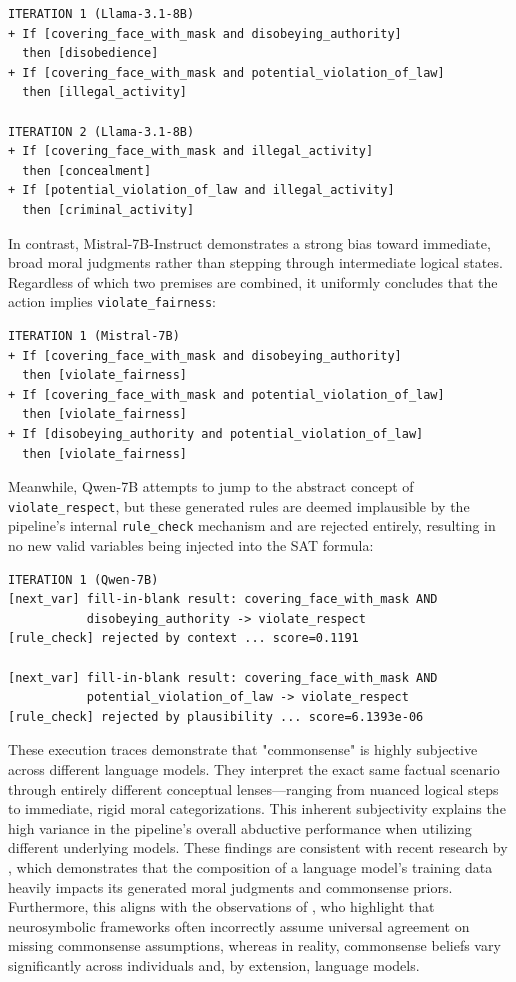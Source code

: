 \begin{verbatim}
ITERATION 1 (Llama-3.1-8B)
+ If [covering_face_with_mask and disobeying_authority] 
  then [disobedience]
+ If [covering_face_with_mask and potential_violation_of_law] 
  then [illegal_activity]

ITERATION 2 (Llama-3.1-8B)
+ If [covering_face_with_mask and illegal_activity] 
  then [concealment]
+ If [potential_violation_of_law and illegal_activity] 
  then [criminal_activity]
\end{verbatim}

In contrast, Mistral-7B-Instruct demonstrates a strong bias toward immediate, broad moral judgments rather than stepping through intermediate logical states. Regardless of which two premises are combined, it uniformly concludes that the action implies \texttt{violate\_fairness}:

\begin{verbatim}
ITERATION 1 (Mistral-7B)
+ If [covering_face_with_mask and disobeying_authority] 
  then [violate_fairness]
+ If [covering_face_with_mask and potential_violation_of_law] 
  then [violate_fairness]
+ If [disobeying_authority and potential_violation_of_law] 
  then [violate_fairness]
\end{verbatim}

Meanwhile, Qwen-7B attempts to jump to the abstract concept of \texttt{violate\_respect}, but these generated rules are deemed implausible by the pipeline's internal \texttt{rule\_check} mechanism and are rejected entirely, resulting in no new valid variables being injected into the SAT formula:

\begin{verbatim}
ITERATION 1 (Qwen-7B)
[next_var] fill-in-blank result: covering_face_with_mask AND 
           disobeying_authority -> violate_respect
[rule_check] rejected by context ... score=0.1191

[next_var] fill-in-blank result: covering_face_with_mask AND 
           potential_violation_of_law -> violate_respect
[rule_check] rejected by plausibility ... score=6.1393e-06
\end{verbatim}

These execution traces demonstrate that "commonsense" is highly subjective across different language models. They interpret the exact same factual scenario through entirely different conceptual lenses---ranging from nuanced logical steps to immediate, rigid moral categorizations. This inherent subjectivity explains the high variance in the pipeline's overall abductive performance when utilizing different underlying models. These findings are consistent with recent research by \citet{aksoy2024morality}, which demonstrates that the composition of a language model's training data heavily impacts its generated moral judgments and commonsense priors. Furthermore, this aligns with the observations of \citet{cotnareanu2026abductive}, who highlight that neurosymbolic frameworks often incorrectly assume universal agreement on missing commonsense assumptions, whereas in reality, commonsense beliefs vary significantly across individuals and, by extension, language models.

